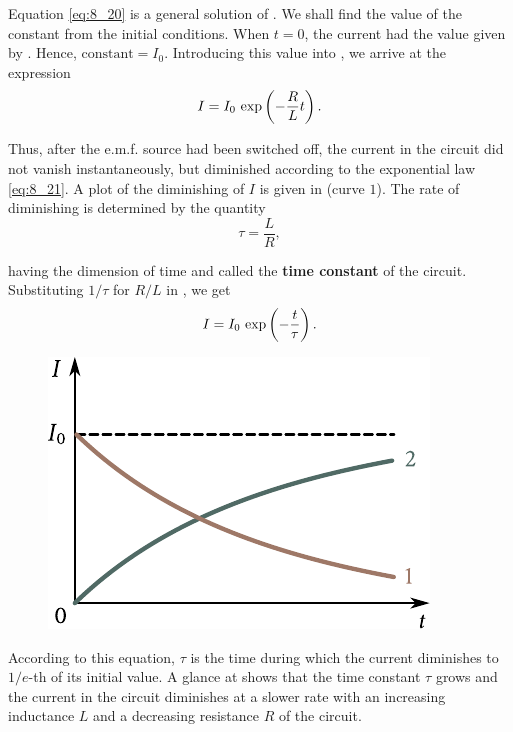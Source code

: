 \noindent
Equation \eqref{eq:8_20} is a general solution of .
We shall find the value of the constant from the initial conditions.
When $t=0$, the current had the value given by .
Hence, $\text{constant}=I_0$.
Introducing this value into , we arrive at the expression
\begin{equation}\label{eq:8_21}
	I = I_0\, \exp\left(- \frac{R}{L} t\right).
\end{equation}

Thus, after the e.m.f. source had been switched off, the current in the circuit did not vanish instantaneously, but diminished according to the exponential law \eqref{eq:8_21}.
A plot of the diminishing of $I$ is given in  (curve $1$).
The rate of diminishing is determined by the quantity
\begin{equation}\label{eq:8_22}
	\tau = \frac{L}{R},
\end{equation}

\noindent
having the dimension of time and called the \textbf{time constant} of the circuit.
Substituting $1/\tau$ for $R/L$ in , we get
\begin{equation}\label{eq:8_23}
	I = I_0\, \exp\left(- \frac{t}{\tau}\right).
\end{equation}

\begin{figure}[t]
	\begin{center}
		\includegraphics[scale=1]{figures/ch_08/fig_8_8.pdf}
		\caption[]{}
		\label{fig:8_8}
	\end{center}
	\vspace{-0.8cm}
\end{figure}

\noindent
According to this equation, $\tau$ is the time during which the current diminishes to $1/e$-th of its initial value.
A glance at  shows that the time constant $\tau$ grows and the current in the circuit diminishes at a slower rate with an increasing inductance $L$ and a decreasing resistance $R$ of the circuit.

